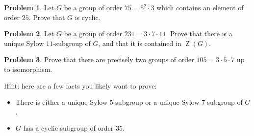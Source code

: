 \documentclass[11pt]{article}
\theoremstyle{definition}
\newtheorem{problem}{Problem}
\begin{document}
\begin{problem}
	Let $G$ be a group of order $75 = 5^2 \cdot 3$ which contains an element of order $25$. Prove that $G$ is cyclic.
\end{problem}



\begin{problem}
Let $G$ be a group of order $231 = 3\cdot 7\cdot 11$.  Prove that there is a unique Sylow $11$-subgroup of $G$, and that it is contained in $\operatorname{Z}(G)$.
\end{problem}




\begin{problem}
Prove that there are precisely two groups of order $105 = 3 \cdot 5 \cdot 7$ up to isomorphism. 

\noindent
Hint: here are a few facts you likely want to prove:

\vspace{-0.5em}
\begin{itemize}[itemsep=-0.2em]
	\item There is either a unique Sylow $5$-subgroup or a unique Sylow $7$-subgroup of $G$. 

\item $G$ has a cyclic subgroup of order $35$.
\end{itemize}
\end{problem}
\end{document}
